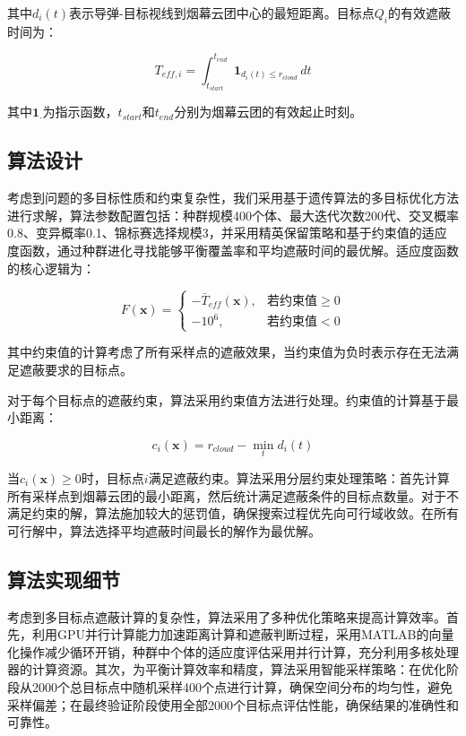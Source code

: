 其中$d_i(t)$表示导弹-目标视线到烟幕云团中心的最短距离。目标点$Q_i$的有效遮蔽时间为：

\[
T_{eff,i} = \int_{t_{start}}^{t_{end}} \mathbf{1}_{d_i(t) \leq r_{cloud}} \, dt
\]

其中$\mathbf{1}_{\cdot}$为指示函数，$t_{start}$和$t_{end}$分别为烟幕云团的有效起止时刻。

\subsection{算法设计}

考虑到问题的多目标性质和约束复杂性，我们采用基于遗传算法的多目标优化方法进行求解，算法参数配置包括：种群规模400个体、最大迭代次数200代、交叉概率0.8、变异概率0.1、锦标赛选择规模3，并采用精英保留策略和基于约束值的适应度函数，通过种群进化寻找能够平衡覆盖率和平均遮蔽时间的最优解。适应度函数的核心逻辑为：

\[
F(\mathbf{x}) = \begin{cases}
-\bar{T}_{eff}(\mathbf{x}), & \text{若约束值} \geq 0 \\
-10^6, & \text{若约束值} < 0
\end{cases}
\]

其中约束值的计算考虑了所有采样点的遮蔽效果，当约束值为负时表示存在无法满足遮蔽要求的目标点。

对于每个目标点的遮蔽约束，算法采用约束值方法进行处理。约束值的计算基于最小距离：

\[
c_i(\mathbf{x}) = r_{cloud} - \min_t d_i(t)
\]

当$c_i(\mathbf{x}) \geq 0$时，目标点$i$满足遮蔽约束。算法采用分层约束处理策略：首先计算所有采样点到烟幕云团的最小距离，然后统计满足遮蔽条件的目标点数量。对于不满足约束的解，算法施加较大的惩罚值，确保搜索过程优先向可行域收敛。在所有可行解中，算法选择平均遮蔽时间最长的解作为最优解。

\subsection{算法实现细节}

考虑到多目标点遮蔽计算的复杂性，算法采用了多种优化策略来提高计算效率。首先，利用GPU并行计算能力加速距离计算和遮蔽判断过程，采用MATLAB的向量化操作减少循环开销，种群中个体的适应度评估采用并行计算，充分利用多核处理器的计算资源。其次，为平衡计算效率和精度，算法采用智能采样策略：在优化阶段从2000个总目标点中随机采样400个点进行计算，确保空间分布的均匀性，避免采样偏差；在最终验证阶段使用全部2000个目标点评估性能，确保结果的准确性和可靠性。

